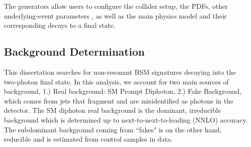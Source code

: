 The generators allow users to configure the collider setup, the PDFs, other underlying-event parameters \cite{Sirunyan:2019dfx}, as well as the main physics model and their corresponding decays to a final state. 


\subsection{Background Determination}

This dissertation searches for non-resonant BSM signatures decaying into the two-photon final state. In this analysis, we account for two main sources of background, 1.) Real background: SM Prompt Diphoton, 2.) Fake Background, which comes from jets that fragment and are misidentified as photons in the detector. The SM diphoton real background is the dominant, irreducible background which is determined up to next-to-next-to-leading (NNLO) accuracy. The subdominant background coming from ``fakes" is on the other hand, reducible and is estimated from control samples in data. 






